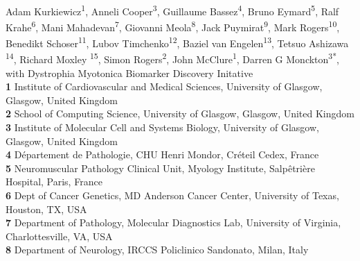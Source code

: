 \documentclass[10pt,letterpaper]{article}
\begin{document}
\vspace*{0.2in}

\begin{flushleft}
{\Large
\textbf{} %
}
\newline
\\
Adam Kurkiewicz\textsuperscript{1},
Anneli Cooper\textsuperscript{3}{\textcurrency},
Guillaume Bassez\textsuperscript{4},
Bruno Eymard\textsuperscript{5},
Ralf Krahe\textsuperscript{6},
Mani Mahadevan\textsuperscript{7},
Giovanni Meola\textsuperscript{8},
Jack Puymirat\textsuperscript{9},
Mark Rogers\textsuperscript{10},
Benedikt Schoser\textsuperscript{11},
Lubov Timchenko\textsuperscript{12},
Baziel van Engelen\textsuperscript{13},
Tetsuo Ashizawa \textsuperscript{14},
Richard Moxley \textsuperscript{15},
Simon Rogers\textsuperscript{2}{\Yinyang},
John McClure\textsuperscript{1}{\Yinyang},
Darren G Monckton\textsuperscript{3*}{\Yinyang},
with Dystrophia Myotonica Biomarker Discovery Initative
\\
\bigskip
\textbf{1} Institute of Cardiovascular and Medical Sciences, University of Glasgow, Glasgow, United Kingdom
\\
\textbf{2} School of Computing Science, University of Glasgow, Glasgow, United Kingdom
\\
\textbf{3} Institute of Molecular Cell and Systems Biology, University of Glasgow, Glasgow, United Kingdom
\\
\textbf{4} Département de Pathologie, CHU Henri Mondor, Créteil Cedex, France
\\
\textbf{5} Neuromuscular Pathology Clinical Unit, Myology Institute, Salpêtrière Hospital, Paris, France
\\
\textbf{6} Dept of Cancer Genetics, MD Anderson Cancer Center, University of Texas, Houston, TX, USA
\\
\textbf{7} Department of Pathology, Molecular Diagnostics Lab, University of Virginia, Charlottesville, VA, USA
\\
\textbf{8} Department of Neurology, IRCCS Policlinico Sandonato, Milan, Italy

\end{flushleft}
\end{document}
